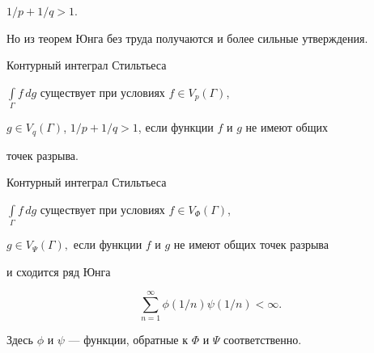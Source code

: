 $1/p+1/q >1$.


Но из теорем Юнга без труда получаются и более сильные утверждения.





\begin{prop}


Контурный интеграл Стильтьеса


$\int\limits_{\Gamma}f\,dg$ существует при условиях $f\in V_{p}(\Gamma)$,


$g\in V_{q}(\Gamma)$, $1/p+1/q >1$, если функции $f$ и $g$ не имеют общих


точек разрыва.


\end{prop}





\begin{prop}


Контурный интеграл Стильтьеса


$\int\limits_{\Gamma}f\,dg$ существует при условиях $f\in V_{\Phi}(\Gamma)$,


$g\in V_{\Psi}(\Gamma),$ если функции $f$ и $g$ не имеют общих точек разрыва


и сходится ряд Юнга


\begin{equation}


\sum_{n=1}^{\infty}\phi (1/n)\psi (1/n) <\infty.


\end{equation}


Здесь $\phi$ и $\psi$ --- функции, обратные к $\Phi$ и $\Psi$ соответственно.


\end{prop}





